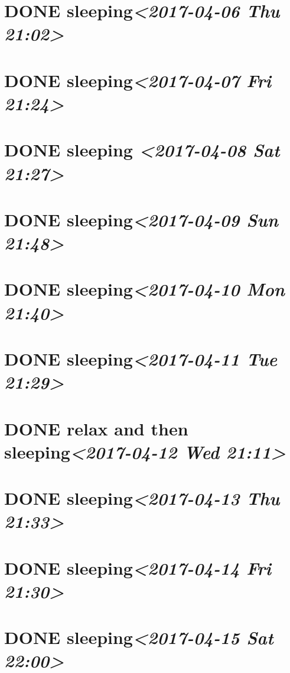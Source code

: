\documentclass[cyan]{elegantnote}
\begin{document}
\section{{\bfseries\sffamily DONE} sleeping\textit{<2017-04-06 Thu 21:02>}}
\label{sec:orgaacb1ff}
\section{{\bfseries\sffamily DONE} sleeping\textit{<2017-04-07 Fri 21:24>}}
\label{sec:org7416567}
\section{{\bfseries\sffamily DONE} sleeping \textit{<2017-04-08 Sat 21:27>}}
\label{sec:org83e6d38}
\section{{\bfseries\sffamily DONE} sleeping\textit{<2017-04-09 Sun 21:48>}}
\label{sec:orgf0a4196}
\section{{\bfseries\sffamily DONE} sleeping\textit{<2017-04-10 Mon 21:40>}}
\label{sec:org2a15977}
\section{{\bfseries\sffamily DONE} sleeping\textit{<2017-04-11 Tue 21:29>}}
\label{sec:org5863634}
\section{{\bfseries\sffamily DONE} relax and then sleeping\textit{<2017-04-12 Wed 21:11>}}
\label{sec:org94ed360}
\section{{\bfseries\sffamily DONE} sleeping\textit{<2017-04-13 Thu 21:33>}}
\label{sec:org27c671b}
\section{{\bfseries\sffamily DONE} sleeping\textit{<2017-04-14 Fri 21:30>}}
\label{sec:orgb266005}
\section{{\bfseries\sffamily DONE} sleeping\textit{<2017-04-15 Sat 22:00>}}
\label{sec:org2f93d54}
\end{document}
